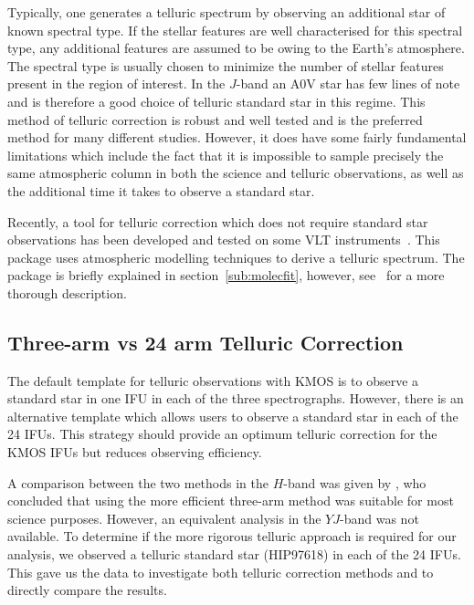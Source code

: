 Typically, one generates a telluric spectrum by observing an additional star of known spectral type.
If the stellar features are well characterised for this spectral type, any additional features are assumed to be owing to the Earth's atmosphere.
The spectral type is usually chosen to minimize the number of stellar features present in the region of interest.
In the $J$-band an A0V star has few lines of note and is therefore a good choice of telluric standard star in this regime.
This method of telluric correction is robust and well tested and is the preferred method for many different studies.
However, it does have some fairly fundamental limitations which include the fact that it is impossible to sample precisely the same atmospheric column in both the science and telluric observations, as well as the additional time it takes to observe a standard star.

Recently, a tool for telluric correction which does not require standard star observations has been developed and tested on some VLT instruments~\citep{2015A&A...576A..77S}.
This package uses atmospheric modelling techniques to derive a telluric spectrum.
The package is briefly explained in section~\ref{sub:molecfit},
however, see~\citet{2015A&A...576A..77S} for a more thorough description.



\subsection{Three-arm vs 24 arm Telluric Correction} %
\label{sub:three_arm_vs_24_arm_telluric_correction}

The default template for telluric observations with KMOS is to observe a standard star in one IFU in each of the three spectrographs.
However, there is an alternative template which allows users to observe a standard star in each of the 24 IFUs.
This strategy should provide an optimum telluric correction for the KMOS IFUs but reduces observing efficiency.

A comparison between the two methods in the $H$-band was given by
\cite{2013A&A...558A..56D},
who concluded that using the more efficient three-arm method was suitable for most science purposes.
However, an equivalent analysis in the $YJ$-band was not available.
To determine if the more rigorous telluric approach is required for our analysis,
we observed a telluric standard star (HIP97618) in each of the 24 IFUs.
This gave us the data to investigate both telluric correction methods and to directly compare the results.

